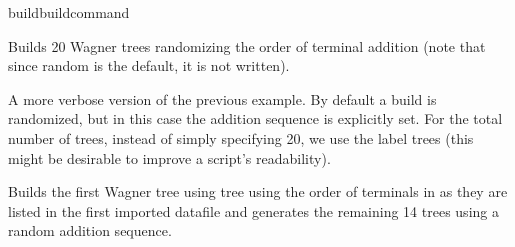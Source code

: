 \begin{command}{build}{buildcommand}
	\begin{poyexamples}
            {Builds 20 Wagner trees randomizing the order of terminal
            addition (note that since random is the default, it is not written).}

            {A more verbose version of the previous example. By default a build
            is randomized, but in this case the addition sequence is explicitly
            set. For the total number of trees, instead of simply specifying 20,
            we use the label trees (this might be desirable to improve a
            script's readability).}

            {Builds the first Wagner tree using  tree using the order of terminals in
            as they are listed in the first imported datafile and generates the remaining
            14 trees using a random addition sequence.}
            
	\end{poyexamples}

\end{command}

